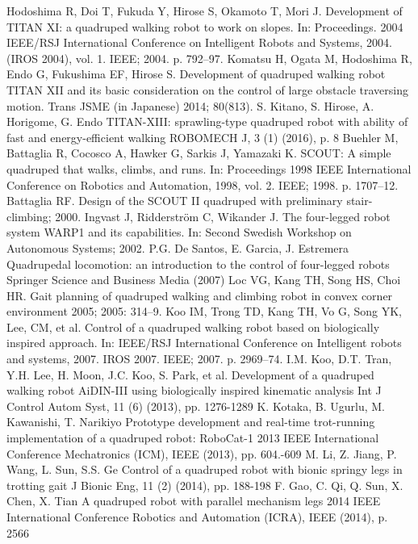 \documentclass[12pt,a4paper]{ctexart}
\begin{document}
{\begin{thebibliography}{99}
	 Hodoshima R, Doi T, Fukuda Y, Hirose S, Okamoto T, Mori J. Development of TITAN XI: a quadruped walking robot to work on slopes. In: Proceedings. 2004 IEEE/RSJ International Conference on Intelligent Robots and Systems, 2004. (IROS 2004), vol. 1. IEEE; 2004. p. 792–97.
	 Komatsu H, Ogata M, Hodoshima R, Endo G, Fukushima EF, Hirose S. Development of quadruped walking robot TITAN XII and its basic consideration on the control of large obstacle traversing motion. Trans JSME (in Japanese) 2014; 80(813).
	 S. Kitano, S. Hirose, A. Horigome, G. Endo
	TITAN-XIII: sprawling-type quadruped robot with ability of fast and energy-efficient walking
	ROBOMECH J, 3 (1) (2016), p. 8
	 Buehler M, Battaglia R, Cocosco A, Hawker G, Sarkis J, Yamazaki K. SCOUT: A simple quadruped that walks, climbs, and runs. In: Proceedings 1998 IEEE International Conference on Robotics and Automation, 1998, vol. 2. IEEE; 1998. p. 1707–12.
	 Battaglia RF. Design of the SCOUT II quadruped with preliminary stair-climbing; 2000.
	 Ingvast J, Ridderström C, Wikander J. The four-legged robot system WARP1 and its capabilities. In: Second Swedish Workshop on Autonomous Systems; 2002.
	 P.G. De Santos, E. Garcia, J. Estremera
	Quadrupedal locomotion: an introduction to the control of four-legged robots
	Springer Science and Business Media (2007)
	 Loc VG, Kang TH, Song HS, Choi HR. Gait planning of quadruped walking and climbing robot in convex corner environment 2005; 2005: 314–9.
	 Koo IM, Trong TD, Kang TH, Vo G, Song YK, Lee, CM, et al. Control of a quadruped walking robot based on biologically inspired approach. In: IEEE/RSJ International Conference on Intelligent robots and systems, 2007. IROS 2007. IEEE; 2007. p. 2969–74.
	 I.M. Koo, D.T. Tran, Y.H. Lee, H. Moon, J.C. Koo, S. Park, et al.
	Development of a quadruped walking robot AiDIN-III using biologically inspired kinematic analysis
	Int J Control Autom Syst, 11 (6) (2013), pp. 1276-1289
	 K. Kotaka, B. Ugurlu, M. Kawanishi, T. Narikiyo
	Prototype development and real-time trot-running implementation of a quadruped robot: RoboCat-1
	2013 IEEE International Conference Mechatronics (ICM), IEEE (2013), pp. 604.-609
	 M. Li, Z. Jiang, P. Wang, L. Sun, S.S. Ge
	Control of a quadruped robot with bionic springy legs in trotting gait
	J Bionic Eng, 11 (2) (2014), pp. 188-198
	 F. Gao, C. Qi, Q. Sun, X. Chen, X. Tian
	A quadruped robot with parallel mechanism legs
	2014 IEEE International Conference Robotics and Automation (ICRA), IEEE (2014), p. 2566

\end{thebibliography}}
\end{document}
